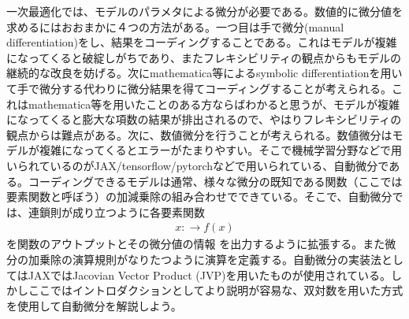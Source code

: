 一次最適化では、モデルのパラメタによる微分が必要である。数値的に微分値を求めるにはおおまかに４つの方法がある。一つ目は手で微分(manual differentiation)をし、結果をコーディングすることである。これはモデルが複雑になってくると破綻しがちであり、またフレキシビリティの観点からもモデルの継続的な改良を妨げる。次にmathematica等によるsymbolic differentiationを用いて手で微分する代わりに微分結果を得てコーディングすることが考えられる。これはmathematica等を用いたことのある方ならばわかると思うが、モデルが複雑になってくると膨大な項数の結果が排出されるので、やはりフレキシビリティの観点からは難点がある。次に、数値微分を行うことが考えられる。数値微分はモデルが複雑になってくるとエラーがたまりやすい。そこで機械学習分野などで用いられているのが{\sf JAX}/tensorflow/pytorchなどで用いられている、自動微分である。コーディングできるモデルは通常、様々な微分の既知である関数（ここでは要素関数と呼ぼう）の加減乗除の組み合わせでできている。そこで、自動微分では、連鎖則が成り立つように各要素関数
\begin{eqnarray}
x:\to f(x)
\end{eqnarray}
を関数のアウトプットとその微分値の情報
を出力するように拡張する。また微分の加乗除の演算規則がなりたつように演算を定義する。自動微分の実装法としては{\sf JAX}ではJacovian Vector Product (JVP)を用いたものが使用されている。しかしここではイントロダクションとしてより説明が容易な、双対数を用いた方式を使用して自動微分を解説しよう。

